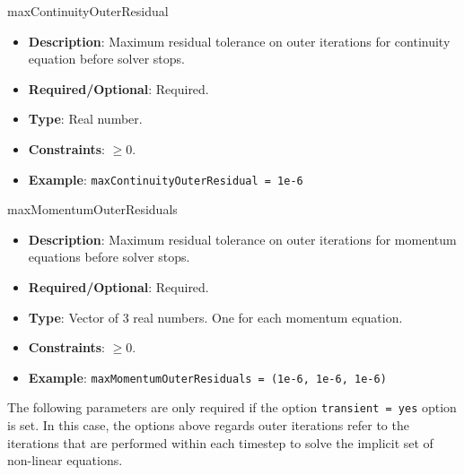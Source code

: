 maxContinuityOuterResidual
\vspace{\the\parameterListSpacing}
\begin{itemize}
    \item {\bf Description}: Maximum residual tolerance on outer iterations for continuity equation before solver stops.
    \item {\bf Required/Optional}: Required.
    \item {\bf Type}: Real number.
    \item {\bf Constraints}: $ \geq 0$.
    \item {\bf Example}: \lstinline!maxContinuityOuterResidual = 1e-6!
\end{itemize}

maxMomentumOuterResiduals
\vspace{\the\parameterListSpacing}
\begin{itemize}
    \item {\bf Description}: Maximum residual tolerance on outer iterations for momentum equations before solver stops.
    \item {\bf Required/Optional}: Required.
    \item {\bf Type}: Vector of 3 real numbers. One for each momentum equation.
    \item {\bf Constraints}: $ \geq 0$.
    \item {\bf Example}: \lstinline!maxMomentumOuterResiduals = (1e-6, 1e-6, 1e-6)!
\end{itemize}



The following parameters are only required if the option \lstinline!transient = yes! option is set. In this case, the options above regards outer iterations refer to the iterations that are performed within each timestep to solve the implicit set of non-linear equations.

